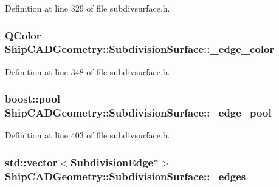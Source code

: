 Definition at line 329 of file subdivsurface.\-h.

\hypertarget{classShipCADGeometry_1_1SubdivisionSurface_a97992c6c6ab3953f4e3152433f786886}{
\subsubsection[{\-\_\-edge\-\_\-color}]{\setlength{\rightskip}{0pt plus 5cm}Q\-Color Ship\-C\-A\-D\-Geometry\-::\-Subdivision\-Surface\-::\-\_\-edge\-\_\-color\hspace{0.3cm}{\ttfamily [protected]}}}\label{classShipCADGeometry_1_1SubdivisionSurface_a97992c6c6ab3953f4e3152433f786886}


Definition at line 348 of file subdivsurface.\-h.

\hypertarget{classShipCADGeometry_1_1SubdivisionSurface_a64367dcb560b1160baedd242fad08d5c}{
\subsubsection[{\-\_\-edge\-\_\-pool}]{\setlength{\rightskip}{0pt plus 5cm}boost\-::pool Ship\-C\-A\-D\-Geometry\-::\-Subdivision\-Surface\-::\-\_\-edge\-\_\-pool\hspace{0.3cm}{\ttfamily [protected]}}}\label{classShipCADGeometry_1_1SubdivisionSurface_a64367dcb560b1160baedd242fad08d5c}


Definition at line 403 of file subdivsurface.\-h.

\hypertarget{classShipCADGeometry_1_1SubdivisionSurface_aeb49c9cecfb5bbf15e0983133e490cdf}{
\subsubsection[{\-\_\-edges}]{\setlength{\rightskip}{0pt plus 5cm}std\-::vector$<${\bf Subdivision\-Edge}$\ast$$>$ Ship\-C\-A\-D\-Geometry\-::\-Subdivision\-Surface\-::\-\_\-edges\hspace{0.3cm}{\ttfamily [protected]}}}\label{classShipCADGeometry_1_1SubdivisionSurface_aeb49c9cecfb5bbf15e0983133e490cdf}



